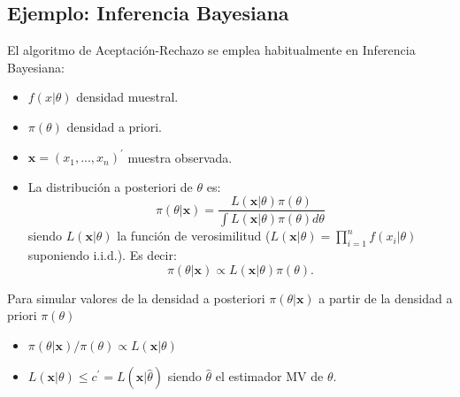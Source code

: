 \documentclass[
]{book}
\newenvironment{Shaded}{\begin{snugshade}}{\end{snugshade}}
\newcommand{\AttributeTok}[1]{\textcolor[rgb]{0.77,0.63,0.00}{#1}}
\newcommand{\CommentTok}[1]{\textcolor[rgb]{0.56,0.35,0.01}{\textit{#1}}}
\newcommand{\DecValTok}[1]{\textcolor[rgb]{0.00,0.00,0.81}{#1}}
\newcommand{\FloatTok}[1]{\textcolor[rgb]{0.00,0.00,0.81}{#1}}
\newcommand{\FunctionTok}[1]{\textcolor[rgb]{0.00,0.00,0.00}{#1}}
\newcommand{\NormalTok}[1]{#1}
\newcommand{\OtherTok}[1]{\textcolor[rgb]{0.56,0.35,0.01}{#1}}
\newcommand{\SpecialCharTok}[1]{\textcolor[rgb]{0.00,0.00,0.00}{#1}}
\theoremstyle{break}
\theoremstyle{definition}
\theoremstyle{definition}
\theoremstyle{definition}
\theoremstyle{definition}
\theoremstyle{remark}
\begin{document}
\begin{enumerate}
\begin{Shaded}
\end{Shaded}
\end{enumerate}

\hypertarget{ejemplo-inferencia-bayesiana}{%
\subsection{Ejemplo: Inferencia Bayesiana}\label{ejemplo-inferencia-bayesiana}}

El algoritmo de Aceptación-Rechazo se emplea habitualmente en
Inferencia Bayesiana:

\begin{itemize}
\item
  \(f(x|\theta )\) densidad muestral.
\item
  \(\pi (\theta )\) densidad a priori.
\item
  \(\mathbf{x}=(x_{1},...,x_n)^{\prime }\) muestra observada.
\item
  La distribución a posteriori de \(\theta\) es:
  \[\pi (\theta |\mathbf{x})=\frac{L(\mathbf{x}|\theta )\pi (\theta )}
  {\int L(\mathbf{x}|\theta )\pi (\theta )d\theta }\]
  siendo \(L(\mathbf{x}|\theta )\) la función de verosimilitud
  (\(L(\mathbf{x}|\theta )=\prod\limits_{i=1}^{n}f(x_{i}|\theta)\)
  suponiendo i.i.d.). Es decir:
  \[\pi (\theta |\mathbf{x})\propto L(\mathbf{x}|\theta )\pi (\theta ).\]
\end{itemize}

Para simular valores de la densidad a posteriori \(\pi (\theta | \mathbf{x})\)
a partir de la densidad a priori \(\pi (\theta )\)

\begin{itemize}
\item
  \(\pi (\theta |\mathbf{x})/\pi (\theta )\propto L(\mathbf{x}|\theta )\)
\item
  \(L(\mathbf{x}|\theta )\leq c^{\prime }=L(\mathbf{x}|\hat{\theta})\) siendo
  \(\hat{\theta}\) el estimador MV de \(\theta\).
\end{itemize}
\end{document}
